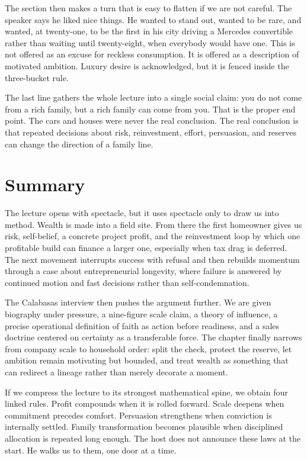 The section then makes a turn that is easy to flatten if we are not careful. The speaker says he liked nice things. He wanted to stand out, wanted to be rare, and wanted, at twenty-one, to be the first in his city driving a Mercedes convertible rather than waiting until twenty-eight, when everybody would have one. This is not offered as an excuse for reckless consumption. It is offered as a description of motivated ambition. Luxury desire is acknowledged, but it is fenced inside the three-bucket rule.

The last line gathers the whole lecture into a single social claim: you do not come from a rich family, but a rich family can come from you. That is the proper end point. The cars and houses were never the real conclusion. The real conclusion is that repeated decisions about risk, reinvestment, effort, persuasion, and reserves can change the direction of a family line.

\section{Summary}

The lecture opens with spectacle, but it uses spectacle only to draw us into method. Wealth is made into a field site. From there the first homeowner gives us risk, self-belief, a concrete project profit, and the reinvestment loop by which one profitable build can finance a larger one, especially when tax drag is deferred. The next movement interrupts success with refusal and then rebuilds momentum through a case about entrepreneurial longevity, where failure is answered by continued motion and fast decisions rather than self-condemnation.

The Calabasas interview then pushes the argument further. We are given biography under pressure, a nine-figure scale claim, a theory of influence, a precise operational definition of faith as action before readiness, and a sales doctrine centered on certainty as a transferable force. The chapter finally narrows from company scale to household order: split the check, protect the reserve, let ambition remain motivating but bounded, and treat wealth as something that can redirect a lineage rather than merely decorate a moment.

If we compress the lecture to its strongest mathematical spine, we obtain four linked rules. Profit compounds when it is rolled forward. Scale deepens when commitment precedes comfort. Persuasion strengthens when conviction is internally settled. Family transformation becomes plausible when disciplined allocation is repeated long enough. The host does not announce these laws at the start. He walks us to them, one door at a time.